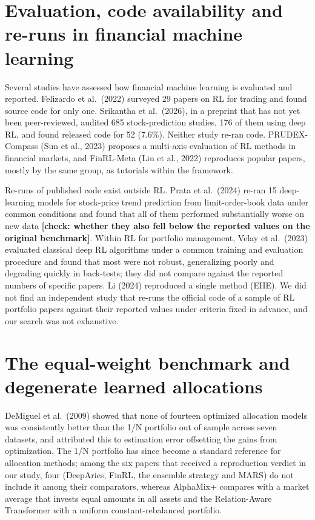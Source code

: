 \documentclass[12pt,a4paper]{report}
\newcounter{none} %
\begin{document}
\section{Evaluation, code availability and re-runs in financial machine
learning}\label{evaluation-code-availability-and-re-runs-in-financial-machine-learning}

Several studies have assessed how financial machine learning is
evaluated and reported. Felizardo et al.~(2022) surveyed 29 papers on RL
for trading and found source code for only one. Srikantha et al.~(2026),
in a preprint that has not yet been peer-reviewed, audited 685
stock-prediction studies, 176 of them using deep RL, and found released
code for 52 (7.6\%). Neither study re-ran code. PRUDEX-Compass (Sun et
al., 2023) proposes a multi-axis evaluation of RL methods in financial
markets, and FinRL-Meta (Liu et al., 2022) reproduces popular papers,
mostly by the same group, as tutorials within the framework.

Re-runs of published code exist outside RL. Prata et al.~(2024) re-ran
15 deep-learning models for stock-price trend prediction from
limit-order-book data under common conditions and found that all of them
performed substantially worse on new data \textbf{{[}check: whether they
also fell below the reported values on the original benchmark{]}}.
Within RL for portfolio management, Velay et al.~(2023) evaluated
classical deep RL algorithms under a common training and evaluation
procedure and found that most were not robust, generalizing poorly and
degrading quickly in back-tests; they did not compare against the
reported numbers of specific papers. Li (2024) reproduced a single
method (EIIE). We did not find an independent study that re-runs the
official code of a sample of RL portfolio papers against their reported
values under criteria fixed in advance, and our search was not
exhaustive.

\section{The equal-weight benchmark and degenerate learned
allocations}\label{the-equal-weight-benchmark-and-degenerate-learned-allocations}

DeMiguel et al.~(2009) showed that none of fourteen optimized allocation
models was consistently better than the 1/N portfolio out of sample
across seven datasets, and attributed this to estimation error
offsetting the gains from optimization. The 1/N portfolio has since
become a standard reference for allocation methods; among the six papers
that received a reproduction verdict in our study, four (DeepAries,
FinRL, the ensemble strategy and MARS) do not include it among their
comparators, whereas AlphaMix+ compares with a market average that
invests equal amounts in all assets and the Relation-Aware Transformer
with a uniform constant-rebalanced portfolio.
\end{document}
